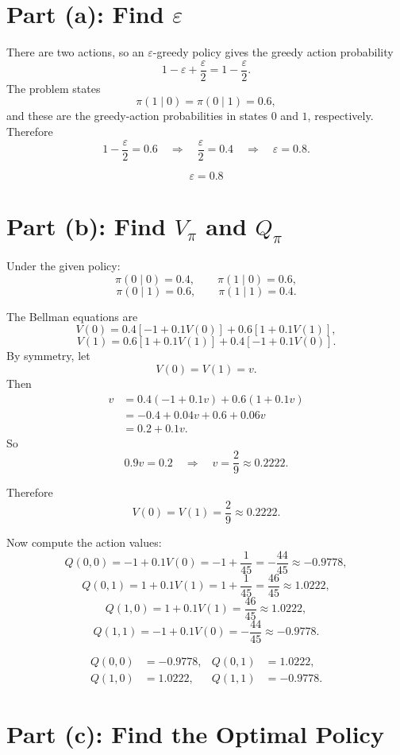 \documentclass[11pt]{article}
\begin{document}
\section*{Part (a): Find \(\varepsilon\)}

There are two actions, so an \(\varepsilon\)-greedy policy gives the greedy action
probability
\[
    1-\varepsilon+\frac{\varepsilon}{2}=1-\frac{\varepsilon}{2}.
\]
The problem states
\[
    \pi(1\mid 0)=\pi(0\mid 1)=0.6,
\]
and these are the greedy-action probabilities in states \(0\) and \(1\),
respectively. Therefore
\[
    1-\frac{\varepsilon}{2}=0.6
    \quad\Rightarrow\quad
    \frac{\varepsilon}{2}=0.4
    \quad\Rightarrow\quad
    \varepsilon=0.8.
\]

\[
    \boxed{\varepsilon=0.8}
\]

\section*{Part (b): Find \(V_\pi\) and \(Q_\pi\)}

Under the given policy:
\[
    \pi(0\mid 0)=0.4,\qquad \pi(1\mid 0)=0.6,
\]
\[
    \pi(0\mid 1)=0.6,\qquad \pi(1\mid 1)=0.4.
\]

The Bellman equations are
\[
    V(0)=0.4[-1+0.1V(0)] + 0.6[1+0.1V(1)],
\]
\[
    V(1)=0.6[1+0.1V(1)] + 0.4[-1+0.1V(0)].
\]
By symmetry, let
\[
    V(0)=V(1)=v.
\]
Then
\[
\begin{aligned}
    v
    &=0.4(-1+0.1v)+0.6(1+0.1v) \\
    &=-0.4+0.04v+0.6+0.06v \\
    &=0.2+0.1v.
\end{aligned}
\]
So
\[
    0.9v=0.2
    \quad\Rightarrow\quad
    v=\frac{2}{9}\approx 0.2222.
\]

Therefore
\[
    \boxed{
    V(0)=V(1)=\frac{2}{9}\approx 0.2222
    }.
\]

Now compute the action values:
\[
    Q(0,0)=-1+0.1V(0)=-1+\frac{1}{45}=-\frac{44}{45}\approx -0.9778,
\]
\[
    Q(0,1)=1+0.1V(1)=1+\frac{1}{45}=\frac{46}{45}\approx 1.0222,
\]
\[
    Q(1,0)=1+0.1V(1)=\frac{46}{45}\approx 1.0222,
\]
\[
    Q(1,1)=-1+0.1V(0)=-\frac{44}{45}\approx -0.9778.
\]

\[
    \boxed{
    \begin{aligned}
    Q(0,0)&=-0.9778, & Q(0,1)&=1.0222,\\
    Q(1,0)&=1.0222,  & Q(1,1)&=-0.9778.
    \end{aligned}}
\]

\section*{Part (c): Find the Optimal Policy}
\end{document}

